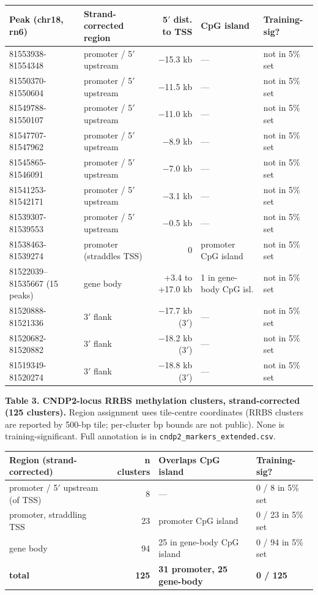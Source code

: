 \documentclass[11pt]{article}
\begin{document}
{\footnotesize
\begin{longtable}{llrll}
\toprule
\textbf{Peak (chr18, rn6)} & \textbf{Strand-corrected region} & \textbf{5$'$ dist. to TSS} & \textbf{CpG island} & \textbf{Training-sig?} \\
\midrule\endhead
81553938-81554348 & promoter / 5$'$ upstream & $-$15.3 kb & --- & not in 5\% set \\
81550370-81550604 & promoter / 5$'$ upstream & $-$11.5 kb & --- & not in 5\% set \\
81549788-81550107 & promoter / 5$'$ upstream & $-$11.0 kb & --- & not in 5\% set \\
81547707-81547962 & promoter / 5$'$ upstream & $-$8.9 kb & --- & not in 5\% set \\
81545865-81546091 & promoter / 5$'$ upstream & $-$7.0 kb & --- & not in 5\% set \\
81541253-81542171 & promoter / 5$'$ upstream & $-$3.1 kb & --- & not in 5\% set \\
81539307-81539553 & promoter / 5$'$ upstream & $-$0.5 kb & --- & not in 5\% set \\
81538463-81539274 & promoter (straddles TSS) & 0 & promoter CpG island & not in 5\% set \\
81522039--81535667 (15 peaks) & gene body & +3.4 to +17.0 kb & 1 in gene-body CpG isl. & not in 5\% set \\
81520888-81521336 & 3$'$ flank & $-$17.7 kb (3$'$) & --- & not in 5\% set \\
81520682-81520882 & 3$'$ flank & $-$18.2 kb (3$'$) & --- & not in 5\% set \\
81519349-81520274 & 3$'$ flank & $-$18.8 kb (3$'$) & --- & not in 5\% set \\
\bottomrule
\end{longtable}
}

\textbf{Table 3. CNDP2-locus RRBS methylation clusters, strand-corrected (125 clusters).} Region assignment uses tile-centre coordinates (RRBS clusters are reported by 500-bp tile; per-cluster bp bounds are not public). None is training-significant. Full annotation is in \texttt{cndp2\_markers\_extended.csv}.

\begin{longtable}{lrll}
\toprule
\textbf{Region (strand-corrected)} & \textbf{n clusters} & \textbf{Overlaps CpG island} & \textbf{Training-sig?} \\
\midrule\endhead
promoter / 5$'$ upstream (of TSS) & 8 & --- & 0 / 8 in 5\% set \\
promoter, straddling TSS & 23 & promoter CpG island & 0 / 23 in 5\% set \\
gene body & 94 & 25 in gene-body CpG island & 0 / 94 in 5\% set \\
\textbf{total} & \textbf{125} & \textbf{31 promoter, 25 gene-body} & \textbf{0 / 125} \\
\bottomrule
\end{longtable}
\end{document}

